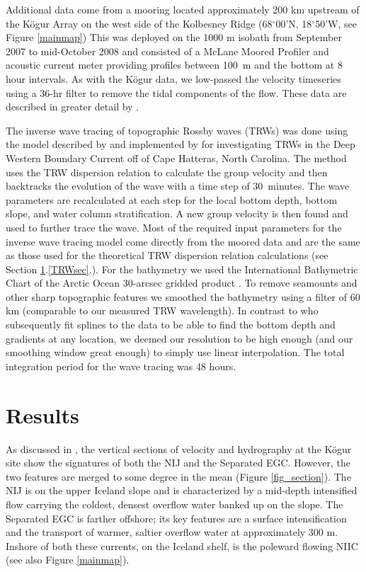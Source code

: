 \documentclass[12pt,titlepage,figuresatend]{article}
\begin{document}
Additional data come from a mooring located approximately 200 km upstream of the K\"{o}gur Array on the west side of the Kolbesney Ridge (68$^{\circ}$00'N, 18$^{\circ}$50'W, see Figure \ref{mainmap}) This was deployed on the 1000 m isobath from September 2007 to mid-October 2008 and consisted of a McLane Moored Profiler and acoustic current meter providing profiles between 100~m and the bottom at 8 hour intervals. As with the K\"{o}gur data, we low-passed the velocity timeseries using a 36-hr filter to remove the tidal components of the flow. These data are described in greater detail by \cite{Jonsson2012}.

The inverse wave tracing of topographic Rossby waves (TRWs) was done using the model described by \cite{Meinen1993} and implemented by \cite{Pickart1995} for investigating TRWs in the Deep Western Boundary Current off of Cape Hatteras, North Carolina. The method uses the TRW dispersion relation to calculate the group velocity and then backtracks the evolution of the wave with a time step of 30~minutes. The wave parameters are recalculated at each step for the local bottom depth, bottom slope, and water column stratification. A new group velocity is then found and used to further trace the wave. Most of the required input parameters for the inverse wave tracing model come directly from the moored data and are the same as those used for the theoretical TRW dispersion relation calculations (see Section \ref{results}.\ref{TRWsec}.). For the bathymetry we used the International Bathymetric Chart of the Arctic Ocean 30-arcsec gridded product \cite[]{Jakobsson2012}. To remove seamounts and other sharp topographic features we smoothed the bathymetry using a filter of 60 km (comparable to our measured TRW wavelength). In contrast to \cite{Pickart1995} who subsequently fit splines to the data to be able to find the bottom depth and gradients at any location, we deemed our resolution to be high enough (and our smoothing window great enough) to simply use linear interpolation. The total integration period for the wave tracing was 48 hours.


\section{Results}
\label{results}

As discussed in \cite{Harden2016}, the vertical sections of velocity and hydrography at the K\"{o}gur site show the signatures of both the NIJ and the Separated EGC. However, the two features are merged to some degree in the mean (Figure \ref{fig_section}). The NIJ is on the upper Iceland slope and is characterized by a mid-depth intensified flow carrying the coldest, densest overflow water banked up on the slope. The Separated EGC is farther offshore; its key features are a surface intensification and the transport of warmer, saltier overflow water at approximately 300 m. Inshore of both these currents, on the Iceland shelf, is the poleward flowing NIIC (see also Figure \ref{mainmap}).
\end{document}
